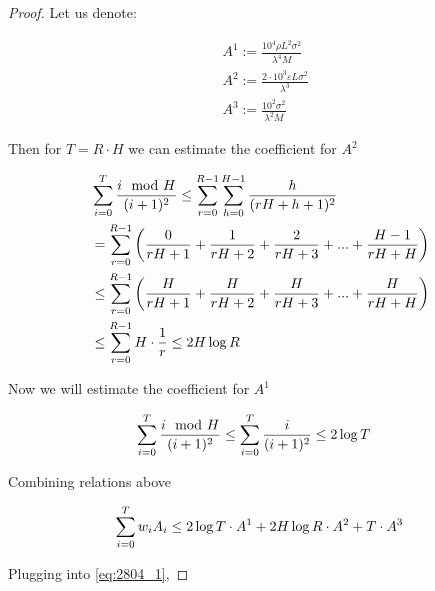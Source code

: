 \begin{proof}
Let us denote:

\begin{align}
    &A^1 := \frac{10^4 \rho L^2 \sigma^2}{\lambda^4 M} \\
    &A^2 := \frac{2\cdot10^3\varepsilon L \sigma^2}{\lambda^3} \\
    &A^3 := \frac{10^2\sigma^2}{\lambda^2 M}
\end{align}

Then for $T = R\cdot H$ we can estimate the coefficient for $A^2$

\begin{align}
    &\summ{i=0}{T} \frac{i \mod H}{(i + 1)^2} 
    \leq 
    \summ{r=0}{R-1} \summ{h=0}{H-1} \frac{h}{(rH + h + 1)^2} \\
    &=
    \summ{r=0}{R-1} \left( \frac{0}{rH + 1} + \frac{1}{rH + 2} + \frac{2}{rH + 3} + ... +\frac{H - 1}{rH + H}\right) \\
    &\leq
    \summ{r=0}{R-1} \left( \frac{H}{rH + 1} + \frac{H}{rH + 2} + \frac{H}{rH + 3} + ... +\frac{H}{rH + H}\right) \\
    &\leq
    \summ{r=0}{R-1} H \cdot \frac{1}{r} \leq 2 H \log{R} 
\end{align}

Now we will estimate the coefficient for $A^1$

\begin{align}
    &\summ{i=0}{T} \frac{i \mod H}{(i + 1)^2} 
    \leq 
    \summ{i=0}{T} \frac{i}{(i + 1)^2} \leq 2 \log{T}
\end{align}

Combining relations above 

\begin{align}
    \summ{i=0}{T} w_i A_i \leq 2 \log{T} \cdot A^1  + 2 H \log{R} \cdot A^2  + T \cdot A^3
\end{align}

Plugging into \eqref{eq:2804_1},


\end{proof}
